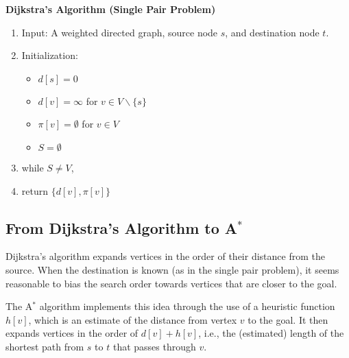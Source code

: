 \begin{algorithm_}\textbf{Dijkstra's Algorithm (Single Pair Problem)}
\begin{enumerate}
\item{Input:} A weighted directed graph, source node $s$, and destination node $t$.

\item Initialization:
\begin{itemize}
  \item[] $d[s] = 0$
  \item[] $d[v] = \infty $ for $v \in V\backslash \{ s\} $
  \item[] $\pi [v] = \emptyset $ for $v \in V$
  \item[] $S = \emptyset $
\end{itemize}

\item while $S \ne V$,





\item return $\{ d[v],\pi [v]\} $
\end{enumerate}
\end{algorithm_}

\subsection{From Dijkstra's Algorithm to A$^*$}

Dijkstra's algorithm expands vertices in the order of their distance from the source. When the destination is known (as in the single pair problem), it seems reasonable to bias the search order towards vertices that are closer to the goal. 

The A$^*$ algorithm implements this idea through the use of a heuristic function $h[v]$, which is an estimate of the distance from vertex $v$ to the goal. It then expands vertices in the order of $d[v] + h[v]$, i.e., the (estimated) length of the shortest path from $s$ to $t$ that passes through $v$.

